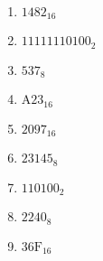 \documentclass[12pt,letterpaper]{article}
\begin{document}
\begin{enumerate}

\item $1482_{16}$

\item $11111110100_2$

\item $537_8$

\item $\textrm{A}23_{16}$

\item $2097_{16}$

\item $23145_{8}$

\item $110100_2$

\item $2240_8$

\item $36\textrm{F}_{16}$

\end{enumerate}
\end{document}
